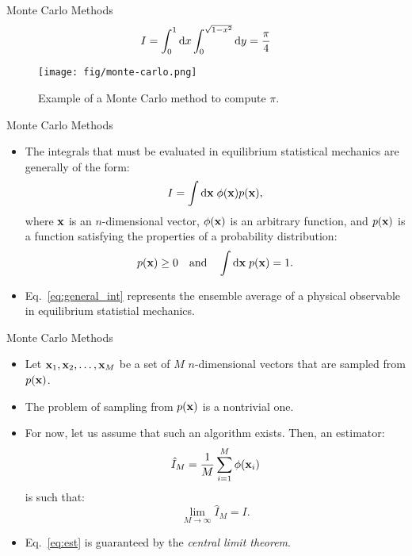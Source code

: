 \documentclass[10pt]{beamer}
\begin{document}
\begin{frame}{Monte Carlo Methods}
\begin{equation}
  I = \int_0^1\mathrm{d} x \int_0^{\sqrt{1-x^2}}\mathrm{d} y = \frac{\pi}{4}
\end{equation}
\begin{figure}
\centering
  \texttt{[image: fig/monte-carlo.png]}
  \caption{Example of a Monte Carlo method to compute $\pi$.}
\end{figure}
\end{frame}

\begin{frame}{Monte Carlo Methods}
\begin{itemize}
\setlength\itemsep{1em}
  \item The integrals that must be evaluated in equilibrium statistical mechanics are generally of the form:
  \begin{equation}
  \label{eq:general_int}
    I = \int\mathrm{d} {\bf x}\; \phi({\bf x}) p({\bf x}),
  \end{equation}
  where ${\bf x}$ is an $n$-dimensional vector, $\phi({\bf x})$ is an arbitrary function, and $p({\bf x})$ is a function satisfying the properties of a probability distribution:
  \begin{equation}
    p({\bf x})\geq 0~~~\mathrm{and}~~~\int\mathrm{d}{\bf x}\; p({\bf x}) = 1.
  \end{equation}

  \item Eq.~\ref{eq:general_int} represents the ensemble average of a physical observable in equilibrium statistial mechanics.
\end{itemize}
\end{frame}

\begin{frame}{Monte Carlo Methods}
\begin{itemize}
\setlength\itemsep{1em}
  \item Let ${\bf x}_1, {\bf x}_2, \dots, {\bf x}_M$ be a set of $M$ $n$-dimensional vectors that are sampled from $p({\bf x})$.

  \item The problem of sampling from $p({\bf x})$ is a nontrivial one.

  \item For now, let us assume that such an algorithm exists. Then, an estimator:
  \begin{equation}
    \hat{I}_M = \frac{1}{M}\sum_{i=1}^M \phi({\bf x}_i)
  \end{equation}
  is such that:
  \begin{equation}
  \label{eq:est}
    \lim_{M\rightarrow\infty} \hat{I}_M = I.
  \end{equation}

  \item Eq.~\ref{eq:est} is guaranteed by the \textit{central limit theorem}.
\end{itemize}
\end{frame}
\end{document}
